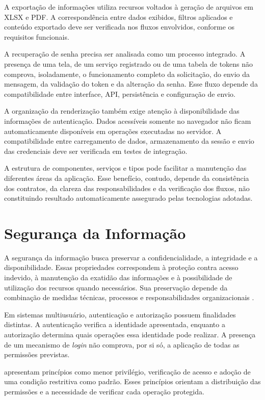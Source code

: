 A exportação de informações utiliza recursos voltados à geração de arquivos em XLSX e PDF. A correspondência entre dados exibidos, filtros aplicados e conteúdo exportado deve ser verificada nos fluxos envolvidos, conforme os requisitos funcionais.

A recuperação de senha precisa ser analisada como um processo integrado. A presença de uma tela, de um serviço registrado ou de uma tabela de tokens não comprova, isoladamente, o funcionamento completo da solicitação, do envio da mensagem, da validação do token e da alteração da senha. Esse fluxo depende da compatibilidade entre interface, API, persistência e configuração de envio.

A organização da renderização também exige atenção à disponibilidade das informações de autenticação. Dados acessíveis somente no navegador não ficam automaticamente disponíveis em operações executadas no servidor. A compatibilidade entre carregamento de dados, armazenamento da sessão e envio das credenciais deve ser verificada em testes de integração.

A estrutura de componentes, serviços e tipos pode facilitar a manutenção das diferentes áreas da aplicação. Esse benefício, contudo, depende da consistência dos contratos, da clareza das responsabilidades e da verificação dos fluxos, não constituindo resultado automaticamente assegurado pelas tecnologias adotadas.

\section{Segurança da Informação}
\label{sec:cap6-seguranca}

A segurança da informação busca preservar a confidencialidade, a integridade e a disponibilidade. Essas propriedades correspondem à proteção contra acesso indevido, à manutenção da exatidão das informações e à possibilidade de utilização dos recursos quando necessários. Sua preservação depende da combinação de medidas técnicas, processos e responsabilidades organizacionais \parencite{Fontes2008Infosec,Anderson2020SecEng}.

Em sistemas multiusuário, autenticação e autorização possuem finalidades distintas. A autenticação verifica a identidade apresentada, enquanto a autorização determina quais operações essa identidade pode realizar. A presença de um mecanismo de \textit{login} não comprova, por si só, a aplicação de todas as permissões previstas.

\textcite{SaltzerSchroeder1975} apresentam princípios como menor privilégio, verificação de acesso e adoção de uma condição restritiva como padrão. Esses princípios orientam a distribuição das permissões e a necessidade de verificar cada operação protegida.

